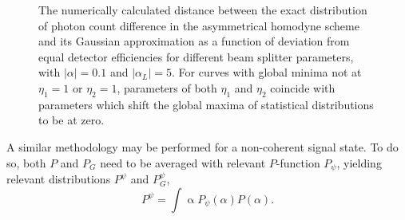 \begin{figure}
\begin{minipage}[c]{.45\linewidth}
\end{minipage}
    \caption{
    The numerically calculated distance between the exact distribution of photon count difference in the asymmetrical homodyne scheme and its Gaussian approximation as a function of deviation from equal detector efficiencies for different beam splitter parameters, with $|\alpha|=0.1$ and $|\alpha_L|=5$. For curves with global minima not at $\eta_1=1$ or $\eta_2=1$, parameters of both $\eta_1$ and $\eta_2$ coincide with parameters which shift the global maxima of statistical distributions to be at zero.
    }\label{fig:delta-eta}
\end{figure}

A similar methodology may be performed for a non-coherent signal state. To do so, both $P$ and $P_G$ need to be averaged with relevant $P$-function $P_\psi$, yielding relevant distributions $P^\psi$ and $P_G^\psi$,
\begin{equation}
P^\psi=\int \mathop{d^2\alpha} P_{\psi}(\alpha)P(\alpha).
\end{equation}

